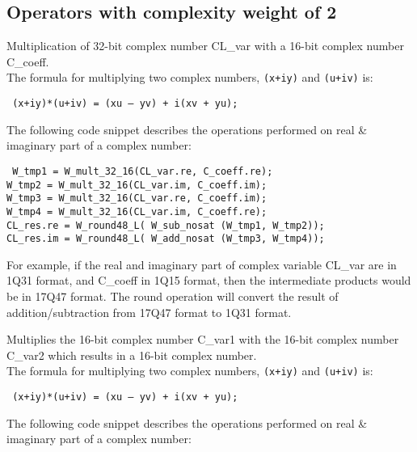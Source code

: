 \subsection{Operators with complexity weight of 2}


Multiplication of 32-bit complex number CL\_var with a 16-bit complex number C\_coeff.\\
The formula for multiplying two complex numbers, {\tt (x+iy)} and {\tt (u+iv)} is:

{\tt {} (x+iy)*(u+iv) = (xu – yv) + i(xv + yu);}

The following code snippet describes the operations performed on real \& imaginary part of a complex number:

{\tt {} W\_tmp1 = W\_mult\_32\_16(CL\_var.re, C\_coeff.re);\\
      W\_tmp2 = W\_mult\_32\_16(CL\_var.im, C\_coeff.im);\\
      W\_tmp3 = W\_mult\_32\_16(CL\_var.re, C\_coeff.im);\\
      W\_tmp4 = W\_mult\_32\_16(CL\_var.im, C\_coeff.re);\\

      CL\_res.re = W\_round48\_L( W\_sub\_nosat (W\_tmp1, W\_tmp2));\\
      CL\_res.im = W\_round48\_L( W\_add\_nosat (W\_tmp3, W\_tmp4));
}

For example, if the real and imaginary part of complex variable CL\_var are in 1Q31 format, and C\_coeff in 1Q15 format, then the intermediate products would be in 17Q47 format.
The round operation will convert the result of addition/subtraction from 17Q47 format to 1Q31 format.


Multiplies the 16-bit complex number C\_var1 with the 16-bit complex number C\_var2 which results in a 16-bit complex number.\\
The formula for multiplying two complex numbers, {\tt (x+iy)} and {\tt (u+iv)} is:

{\tt {} (x+iy)*(u+iv) = (xu – yv) + i(xv + yu);}

The following code snippet describes the operations performed on real \& imaginary part of a complex number:

